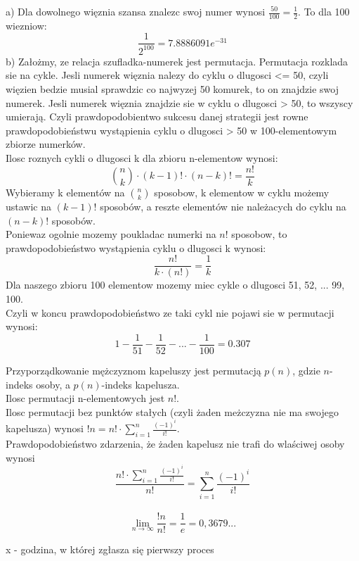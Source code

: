 \documentclass[fleqn]{article}
\begin{document}
a) Dla dowolnego więznia szansa znalezc swoj numer wynosi $\frac{50}{100} = \frac{1}{2}$. To dla 100 wiezniow: \\
\[\frac{1}{2^{100}} = 7.8886091e^{-31}\]
b) Założmy, ze relacja szufladka-numerek jest permutacja. Permutacja rozklada sie na cykle. Jesli numerek więznia nalezy do cyklu o dlugosci <= 50, czyli więzien bedzie musial sprawdzic co najwyzej 50 komurek, to on znajdzie swoj numerek. Jesli numerek więznia znajdzie sie w cyklu o dlugosci > 50, to wszyscy umierają. Czyli prawdopodobientwo sukcesu danej strategii jest rowne prawdopodobieństwu wystąpienia cyklu o dlugosci > 50 w 100-elementowym zbiorze numerków.\\
Ilosc roznych cykli o dlugosci k dla zbioru n-elementow wynosi:\\
\[{n \choose k}\cdot(k-1)!\cdot(n-k)! = \frac{n!}{k}\]
Wybieramy k elementów na ${n \choose k}$ sposobow, k elementow w cyklu możemy ustawic na $(k-1)!$ sposobów, a reszte elementów nie należacych do cyklu na $(n-k)!$ sposobów.\\
Poniewaz ogolnie mozemy poukladac numerki na $n!$ sposobow, to prawdopodobieństwo wystąpienia cyklu o dlugosci k wynosi:
\[\frac{n!}{k\cdot(n!)} = \frac{1}{k}\]
Dla naszego zbioru 100 elementow mozemy miec cykle o dlugosci 51, 52, ... 99, 100.\\
Czyli w koncu prawdopodobieństwo ze taki cykl nie pojawi sie w permutacji wynosi:
\[1 - \frac{1}{51} - \frac{1}{52} - ... - \frac{1}{100} = 0.307\]

\medskip
  
\medskip

Przyporządkowanie mężczyznom kapeluszy jest permutacją $p(n)$, gdzie $n$-indeks osoby, a $p(n)$-indeks kapelusza. \\
Ilosc permutacji n-elementowych jest $n!$. \\
Ilosc permutacji bez punktów stałych (czyli żaden meżczyzna nie ma swojego kapelusza) wynosi ${!n} = {n!}\cdot\sum_{i=1}^{n} \frac{(-1)^{i}}{i!}$. \\
Prawdopodobieństwo zdarzenia, że żaden kapelusz nie trafi do wlaściwej osoby wynosi
\[\frac{{n!}\cdot\sum_{i=1}^{n} \frac{(-1)^{i}}{i!}}{n!} = \sum_{i=1}^{n} \frac{(-1)^{i}}{i!}\]
\\
\[\lim_{n\to\infty} \frac{!n}{n!} = \frac{1}{e} = 0,3679...\]

\medskip
{}
\medskip

x - godzina, w której zgłasza się pierwszy proces
\end{document}
